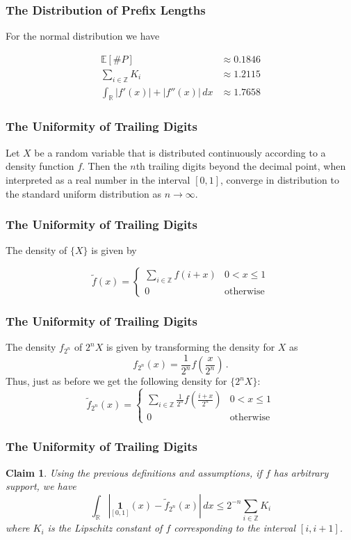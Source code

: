 \documentclass{beamer}
\newcommand{\ev}[2]{\underset{#1}{\mathbb{E}}\left[#2\right]}
\newtheorem{claim}{Claim}
\begin{document}
\begin{frame}
\frametitle{The Distribution of Prefix Lengths}
\begin{center}
For the normal distribution we have
\end{center}
\[
\begin{split}
\ev{}{\#P} & \approx 0.1846\\
\sum_{i\in\mathbb{Z}} K_i & \approx 1.2115\\
\int_\mathbb{R}|f'(x)|+|f''(x)|\,dx & \approx 1.7658
\end{split}
\]
\end{frame}

\begin{frame}
\frametitle{The Uniformity of Trailing Digits}
\begin{theorem}
	Let $X$ be a random variable that is distributed continuously according to a density function $f$. Then the $n$th trailing digits beyond the decimal point, when interpreted as a real number in the interval $[0,1]$, converge in distribution to the standard uniform distribution as $n\rightarrow\infty$.
\end{theorem}
\end{frame}

\begin{frame}
\frametitle{The Uniformity of Trailing Digits}
\begin{center}
The density of $\{X\}$ is given by

\[
\tilde{f}(x) =
\begin{cases}
\sum_{i\in\mathbb{Z}}f(i+x) & 0 < x \leq 1\\
0 & \text{otherwise}
\end{cases}
\]
\end{center}
\end{frame}

\begin{frame}
\frametitle{The Uniformity of Trailing Digits}
The density $f_{2^n}$ of $2^nX$ is given by transforming the density for $X$ as
\[
f_{2^n}(x) = \frac{1}{2^n}f\left(\frac{x}{2^n}\right)\,.
\]
Thus, just as before we get the following density for $\{2^nX\}$:
\[
\tilde{f}_{2^n}(x)=
\begin{cases}
\sum_{i\in\mathbb{Z}}\frac{1}{2^n}f\left(\frac{i+x}{2^n}\right) & 0<x\leq 1\\
0 & \text{otherwise}
\end{cases}
\]
\end{frame}

\begin{frame}
\frametitle{The Uniformity of Trailing Digits}
\begin{claim}
	Using the previous definitions and assumptions, if $f$ has arbitrary support, we have
	\[
	\int_\mathbb{R} \left|\underset{[0,1]}{\mathbf{1}}(x)-\tilde{f}_{2^n}(x)\right|\,dx\leq2^{-n}\sum_{i\in\mathbb{Z}}K_i
	\]
	where $K_i$ is the Lipschitz constant of $f$ corresponding to the interval $[i,i+1]$.
\end{claim}
\end{frame}
\end{document}
